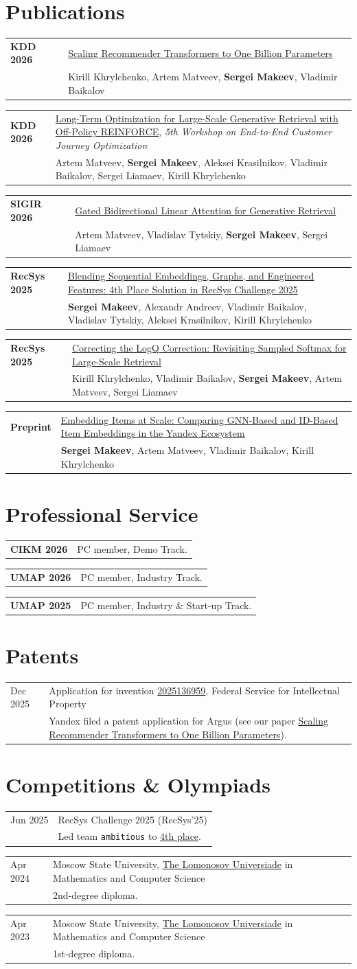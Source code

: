 \documentclass[10pt,letterpaper]{article}
\makeatletter
\newcommand{\cvsection}[1]{\section*{#1}}
\newcommand{\daterow}[3]{%
  \begin{tabularx}{\textwidth}{@{}p{1.18in}X@{}}
    #1 & #2\\
       & #3
  \end{tabularx}\vspace{0.18em}
}
\newcommand{\publication}[3]{%
  \begin{tabularx}{\textwidth}{@{}p{1.18in}X@{}}
    \textbf{#1} & #2\\
                & #3
  \end{tabularx}\vspace{0.22em}
}
\newcommand{\service}[2]{%
  \begin{tabularx}{\textwidth}{@{}p{1.18in}X@{}}
    \textbf{#1} & #2
  \end{tabularx}\vspace{0.22em}
}
\makeatother
\begin{document}
\cvsection{Publications}
\publication{KDD 2026}{\href{https://neuralsrg.github.io/publication/2026-07-05-argus}{Scaling Recommender Transformers to One Billion Parameters}}{Kirill Khrylchenko, Artem Matveev, \textbf{Sergei Makeev}, Vladimir Baikalov}
\publication{KDD 2026}{\href{https://neuralsrg.github.io/publication/2026-07-01-long-term-optimization}{Long-Term Optimization for Large-Scale Generative Retrieval with Off-Policy REINFORCE}, \textit{5th Workshop on End-to-End Customer Journey Optimization}}{Artem Matveev, \textbf{Sergei Makeev}, Aleksei Krasilnikov, Vladimir Baikalov, Sergei Liamaev, Kirill Khrylchenko}
\publication{SIGIR 2026}{\href{https://neuralsrg.github.io/publication/2026-06-08-gbla}{Gated Bidirectional Linear Attention for Generative Retrieval}}{Artem Matveev, Vladislav Tytskiy, \textbf{Sergei Makeev}, Sergei Liamaev}
\publication{RecSys 2025}{\href{https://neuralsrg.github.io/publication/2025-08-09-challenge}{Blending Sequential Embeddings, Graphs, and Engineered Features: 4th Place Solution in RecSys Challenge 2025}}{\textbf{Sergei Makeev}, Alexandr Andreev, Vladimir Baikalov, Vladislav Tytskiy, Aleksei Krasilnikov, Kirill Khrylchenko}
\publication{RecSys 2025}{\href{https://neuralsrg.github.io/publication/2025-07-12-correcting}{Correcting the LogQ Correction: Revisiting Sampled Softmax for Large-Scale Retrieval}}{Kirill Khrylchenko, Vladimir Baikalov, \textbf{Sergei Makeev}, Artem Matveev, Sergei Liamaev}
\publication{Preprint}{\href{https://neuralsrg.github.io/publication/2024-06-01-gnns}{Embedding Items at Scale: Comparing GNN-Based and ID-Based Item Embeddings in the Yandex Ecosystem}}{\textbf{Sergei Makeev}, Artem Matveev, Vladimir Baikalov, Kirill Khrylchenko}

\cvsection{Professional Service}
\service{CIKM 2026}{PC member, Demo Track.}
\service{UMAP 2026}{PC member, Industry Track.}
\service{UMAP 2025}{PC member, Industry \& Start-up Track.}

\cvsection{Patents}
\daterow{Dec 2025}{Application for invention \href{https://www1.fips.ru/registers-doc-view/fips_servlet?DB=RUPAT\&DocNumber=2025136959\&TypeFile=html}{2025136959}, Federal Service
for Intellectual Property}{Yandex filed a patent application for Argus (see our paper \href{https://neuralsrg.github.io/publication/2026-07-05-argus}{Scaling Recommender Transformers to One Billion Parameters}).}

\cvsection{Competitions \& Olympiads}
\daterow{Jun 2025}{RecSys Challenge 2025 (RecSys'25)}{Led team \texttt{ambitious} to \href{https://recsys.synerise.com/results/final-leaderboard}{4th place}.}
\daterow{Apr 2024}{Moscow State University, \href{https://confhub.ru/eng/event/7925/}{The Lomonosov Universiade} in Mathematics and Computer Science}{2nd-degree diploma.}
\daterow{Apr 2023}{Moscow State University, \href{https://confhub.ru/eng/event/7925/}{The Lomonosov Universiade} in Mathematics and Computer Science}{1st-degree diploma.}
\end{document}
